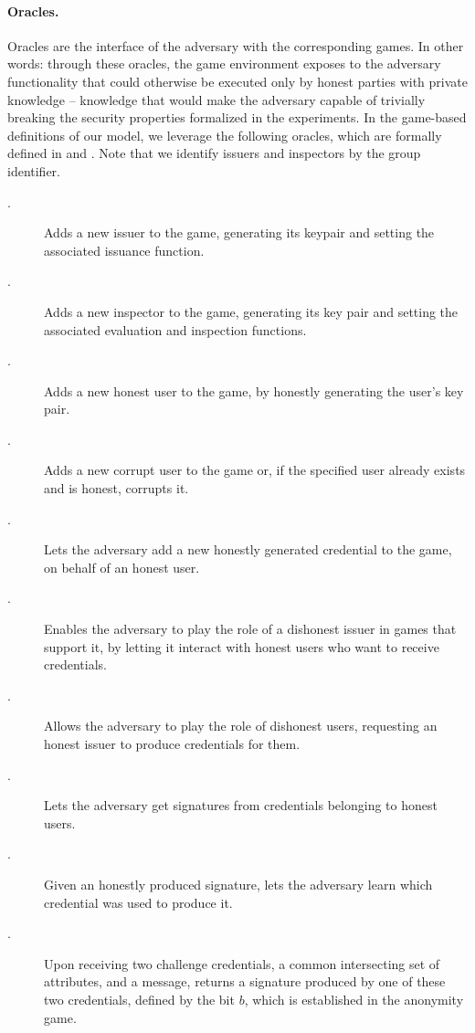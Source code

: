\paragraph{Oracles.} %
Oracles are the interface of the adversary with the corresponding games. In
other words: through these oracles, the game environment exposes to the adversary
functionality that could otherwise be executed only by honest parties with
private knowledge -- knowledge that would make the adversary capable of
trivially breaking the security properties formalized in the experiments.
In the game-based definitions of our \GSAC model, we leverage the following
oracles, which are formally defined in  and
. Note that we identify issuers and inspectors by the group
identifier.

\begin{description}
\item[\IGEN.] Adds a new issuer to the game, generating its keypair and setting
  the associated issuance function.
\item[\OGEN.] Adds a new inspector to the game, generating its key pair and
  setting the associated evaluation and inspection functions.
\item[\HUGEN.] Adds a new honest user to the game, by honestly generating
  the user's key pair.
\item[\CUGEN.] Adds a new corrupt user to the game or, if the specified
  user already exists and is honest, corrupts it.
\item[\OBTISS.] Lets the adversary add a new honestly generated credential to
  the game, on behalf of an honest user.
\item[\OBTAIN.] Enables the adversary to play the role of a dishonest issuer
  in games that support it, by letting it interact with honest users who want to
  receive credentials.
\item[\ISSUE.] Allows the adversary to play the role of dishonest users,
  requesting an honest issuer to produce credentials for them.
\item[\SIGN.] Lets the adversary get signatures from credentials belonging
  to honest users.
\item[\OPEN.] Given an honestly produced signature, lets the adversary learn
  which credential was used to produce it.
\item[\CHALb.] Upon receiving two challenge credentials, a common intersecting
  set of attributes, and a message, returns a signature produced by one of these
  two credentials, defined by the bit $b$, which is established in the anonymity
  game.
\end{description}

